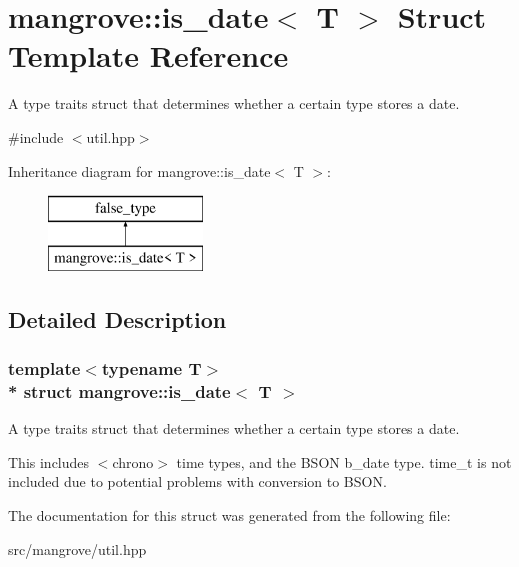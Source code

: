 \hypertarget{structmangrove_1_1is__date}{}\section{mangrove\+:\+:is\+\_\+date$<$ T $>$ Struct Template Reference}
\label{structmangrove_1_1is__date}


A type traits struct that determines whether a certain type stores a date.  




{\ttfamily \#include $<$util.\+hpp$>$}

Inheritance diagram for mangrove\+:\+:is\+\_\+date$<$ T $>$\+:\begin{figure}[H]
\begin{center}
\leavevmode
\includegraphics[height=2.000000cm]{structmangrove_1_1is__date}
\end{center}
\end{figure}


\subsection{Detailed Description}
\subsubsection*{template$<$typename T$>$\\*
struct mangrove\+::is\+\_\+date$<$ T $>$}

A type traits struct that determines whether a certain type stores a date. 

This includes $<$chrono$>$ time types, and the B\+S\+ON b\+\_\+date type. time\+\_\+t is not included due to potential problems with conversion to B\+S\+ON. 

The documentation for this struct was generated from the following file\+:\begin{DoxyCompactItemize}
\item 
src/mangrove/util.\+hpp\end{DoxyCompactItemize}
